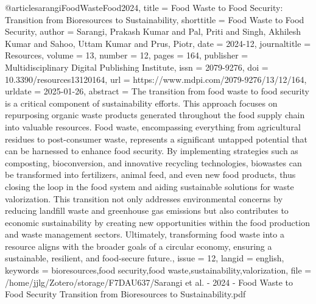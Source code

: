 {{{{@article{sarangiFoodWasteFood2024,
  title = {Food {{Waste}} to {{Food Security}}: {{Transition}} from {{Bioresources}} to {{Sustainability}}},
  shorttitle = {Food {{Waste}} to {{Food Security}}},
  author = {Sarangi, Prakash Kumar and Pal, Priti and Singh, Akhilesh Kumar and Sahoo, Uttam Kumar and Prus, Piotr},
  date = {2024-12},
  journaltitle = {Resources},
  volume = {13},
  number = {12},
  pages = {164},
  publisher = {Multidisciplinary Digital Publishing Institute},
  issn = {2079-9276},
  doi = {10.3390/resources13120164},
  url = {https://www.mdpi.com/2079-9276/13/12/164},
  urldate = {2025-01-26},
  abstract = {The transition from food waste to food security is a critical component of sustainability efforts. This approach focuses on repurposing organic waste products generated throughout the food supply chain into valuable resources. Food waste, encompassing everything from agricultural residues to post-consumer waste, represents a significant untapped potential that can be harnessed to enhance food security. By implementing strategies such as composting, bioconversion, and innovative recycling technologies, biowastes can be transformed into fertilizers, animal feed, and even new food products, thus closing the loop in the food system and aiding sustainable solutions for waste valorization. This transition not only addresses environmental concerns by reducing landfill waste and greenhouse gas emissions but also contributes to economic sustainability by creating new opportunities within the food production and waste management sectors. Ultimately, transforming food waste into a resource aligns with the broader goals of a circular economy, ensuring a sustainable, resilient, and food-secure future.},
  issue = {12},
  langid = {english},
  keywords = {bioresources,food security,food waste,sustainability,valorization},
  file = {/home/jjlg/Zotero/storage/F7DAU637/Sarangi et al. - 2024 - Food Waste to Food Security Transition from Bioresources to Sustainability.pdf}
}

}}}}
